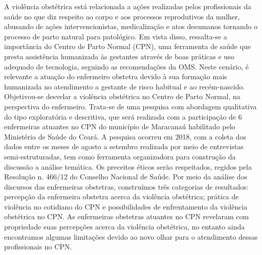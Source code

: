 A violência obstétrica está relacionada a ações realizadas pelos profissionais da saúde no que diz respeito ao corpo e aos processos reprodutivos da mulher, abusando de ações intervencionistas, medicalização e atos desumanos tornando o processo de parto natural para patológico. Em vista disso, ressalta-se a importância do Centro de Parto Normal (CPN), uma ferramenta de saúde que presta assistência humanizada às gestantes através de boas práticas e uso adequado de tecnologia, seguindo as recomendações da OMS. Neste cenário, é relevante a atuação do enfermeiro obstetra devido à sua formação mais humanizada no atendimento a gestante de risco habitual e ao recém-nascido. Objetivou-se desvelar a violência obstétrica no Centro de Parto Normal, na perspectiva do enfermeiro. Trata-se de uma pesquisa com abordagem qualitativa do tipo exploratória e descritiva, que será realizada com a participação de 6 enfermeiras atuantes no CPN do município de Maracanaú habilitado pelo Ministério de Saúde do Ceará. A pesquisa ocorreu em 2018, com a coleta dos dados entre os meses de agosto a setembro realizada por meio de entrevistas semi-estruturadas, tem como ferramenta organizadora para construção da discussão a análise temática. Os preceitos éticos serão respeitados, regidos pela Resolução n. 466/12 do Conselho Nacional de Saúde. Por meio da análise dos discursos das enfermeiras obstetras, construímos três categorias de resultados: percepção da enfermeira obstetra acerca da violência obstétrica; prática de violência no cotidiano do CPN e possibilidades de enfrentamento da violência obstétrica no CPN. As enfermeiras obstetras atuantes no CPN revelaram com propriedade suas percepções acerca da violência obstétrica, no entanto ainda encontramos algumas limitações devido ao novo olhar para o atendimento dessas profissionais no CPN.

